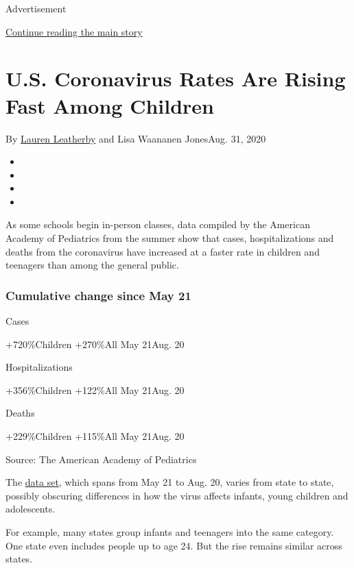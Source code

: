 Advertisement

\protect\hyperlink{after-top}{Continue reading the main story}

\hypertarget{us-coronavirus-rates-are-rising-fast-among-children}{%
\section{U.S. Coronavirus Rates Are Rising Fast Among
Children}\label{us-coronavirus-rates-are-rising-fast-among-children}}

By \href{https://www.nytimes3xbfgragh.onion/by/lauren-leatherby}{Lauren
Leatherby} and Lisa Waananen JonesAug. 31, 2020

\begin{itemize}
\item
\item
\item
\item
\end{itemize}

As some schools begin in-person classes, data compiled by the American
Academy of Pediatrics from the summer show that cases, hospitalizations
and deaths from the coronavirus have increased at a faster rate in
children and teenagers than among the general public.

\hypertarget{cumulative-change-since-may-21}{%
\subsubsection{Cumulative change since May
21}\label{cumulative-change-since-may-21}}

Cases

+720\%Children +270\%All May 21Aug. 20

Hospitalizations

+356\%Children +122\%All May 21Aug. 20

Deaths

+229\%Children +115\%All May 21Aug. 20

Source: The American Academy of Pediatrics

The
\href{https://services.aap.org/en/pages/2019-novel-coronavirus-covid-19-infections/children-and-covid-19-state-level-data-report/}{data
set}, which spans from May 21 to Aug. 20, varies from state to state,
possibly obscuring differences in how the virus affects infants, young
children and adolescents.

For example, many states group infants and teenagers into the same
category. One state even includes people up to age 24. But the rise
remains similar across states.

